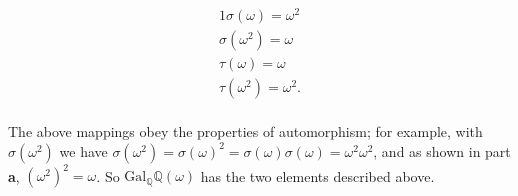 \documentclass{article}
\begin{document}
\begin{alignat*}{1}
  \sigma(\omega) = \omega^2 \\ 
  \sigma(\omega^2) = \omega \\ 
  \tau(\omega) = \omega \\ 
  \tau(\omega^2) = \omega^2. \\
\end{alignat*}

The above mappings obey the properties of automorphism; for example, 
with $\sigma(\omega^2)$ we have  
$\sigma(\omega^2) = \sigma(\omega)^2 = \sigma(\omega)\sigma(\omega) = \omega^2 \omega^2$, 
and as shown in part \textbf{a}, $(\omega^2)^2 = \omega$.  So $\mathrm{Gal}_{\mathbb{Q}}\mathbb{Q}(\omega)$ 
has the two elements described above.
\end{document}
